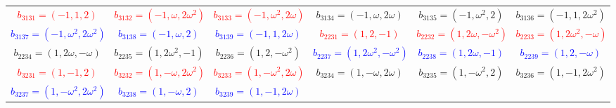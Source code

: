 \documentclass[%
  reprint,
  superscriptaddress,
  showkeys,
  amsmath,amssymb,
  aps,pra,
  longbibliography,
  floatfix,
  x11names
]{revtex4-2}
\begin{document}
\begin{table}[htbp!]
\begin{ruledtabular}
\begin{tabular}{*{6}{c}}
\textcolor{red}{$b_{3131}=(-1,1,2)$} & \textcolor{red}{$b_{3132}=(-1,\omega,2\omega^2)$} & \textcolor{red}{$b_{3133}=(-1,\omega^2,2\omega)$} & \textcolor{green!40!black}{$b_{3134}=(-1,\omega,2\omega)$} & \textcolor{green!40!black}{$b_{3135}=(-1,\omega^2,2)$} & \textcolor{green!40!black}{$b_{3136}=(-1,1,2\omega^2)$} \\
\textcolor{blue}{$b_{3137}=(-1,\omega^2,2\omega^2)$} & \textcolor{blue}{$b_{3138}=(-1,\omega,2)$} & \textcolor{blue}{$b_{3139}=(-1,1,2\omega)$} & \textcolor{red}{$b_{2231}=(1,2,-1)$} & \textcolor{red}{$b_{2232}=(1,2\omega,-\omega^2)$} & \textcolor{red}{$b_{2233}=(1,2\omega^2,-\omega)$} \\
\textcolor{green!40!black}{$b_{2234}=(1,2\omega,-\omega)$} & \textcolor{green!40!black}{$b_{2235}=(1,2\omega^2,-1)$} & \textcolor{green!40!black}{$b_{2236}=(1,2,-\omega^2)$} & \textcolor{blue}{$b_{2237}=(1,2\omega^2,-\omega^2)$} & \textcolor{blue}{$b_{2238}=(1,2\omega,-1)$} & \textcolor{blue}{$b_{2239}=(1,2,-\omega)$} \\
\textcolor{red}{$b_{3231}=(1,-1,2)$} & \textcolor{red}{$b_{3232}=(1,-\omega,2\omega^2)$} & \textcolor{red}{$b_{3233}=(1,-\omega^2,2\omega)$} & \textcolor{green!40!black}{$b_{3234}=(1,-\omega,2\omega)$} & \textcolor{green!40!black}{$b_{3235}=(1,-\omega^2,2)$} & \textcolor{green!40!black}{$b_{3236}=(1,-1,2\omega^2)$} \\
\textcolor{blue}{$b_{3237}=(1,-\omega^2,2\omega^2)$} & \textcolor{blue}{$b_{3238}=(1,-\omega,2)$} & \textcolor{blue}{$b_{3239}=(1,-1,2\omega)$} & & & \\
\end{tabular}
\end{ruledtabular}
\end{table}
\end{document}
